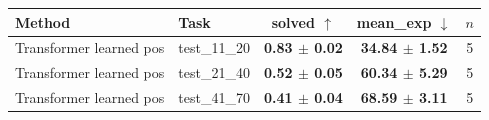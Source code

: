 \begin{tabular}{llccc}
\toprule
Method & Task & solved $\uparrow$ & mean\_exp $\downarrow$ & $n$ \\
\midrule
Transformer learned pos & test\_11\_20 & \textbf{0.83 $\pm$ 0.02} & \textbf{34.84 $\pm$ 1.52} & 5 \\
\midrule
Transformer learned pos & test\_21\_40 & \textbf{0.52 $\pm$ 0.05} & \textbf{60.34 $\pm$ 5.29} & 5 \\
\midrule
Transformer learned pos & test\_41\_70 & \textbf{0.41 $\pm$ 0.04} & \textbf{68.59 $\pm$ 3.11} & 5 \\
\bottomrule
\end{tabular}
